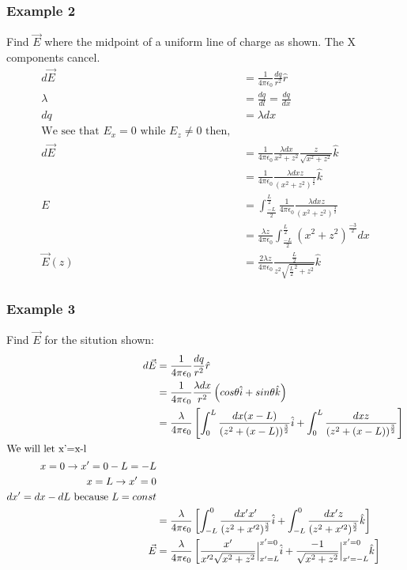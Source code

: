   \subsubsection{Example 2}
  Find $\vec{E}$ where the midpoint of a uniform line of charge as shown. The X components cancel.
  \begin{align*}
    d\vec{E}&=\frac{1}{4\pi\epsilon_0}\frac{dq}{r^2}\hat{r}\\
    \lambda&=\frac{dq}{dl}=\frac{dq}{dx}\\
    dq&=\lambda dx\\
    \text{We see that } E_x=0 \text{ while } E_z\neq 0 \text{ then, }\\
    d\vec{E}&=\frac{1}{4\pi\epsilon_0}\frac{\lambda dx}{x^2+z^2}\frac{z}{\sqrt{x^2+z^2}}\hat{k}\\
    &=\frac{1}{4\pi\epsilon_0}\frac{\lambda dxz}{(x^2+z^2)^{\frac{3}{2}}}\hat{k}\\
    E&=\int_{\frac{-L}{2}}^{\frac{L}{2}}\frac{1}{4\pi\epsilon_0}\frac{\lambda dxz}{(x^2+z^2)^{\frac{3}{2}}}\\
    &=\frac{\lambda z}{4\pi\epsilon_0}\int_{\frac{-L}{2}}^{\frac{L}{2}}(x^2+z^2)^{\frac{-3}{2}}dx\\
    \vec{E}(z)&=\frac{2\lambda z}{4\pi\epsilon_0}\frac{\frac{L}{2}}{z^2\sqrt{\frac{L}{2}^2+z^2}}\hat{k}
  \end{align*}
  \subsubsection{Example 3}
  Find $\vec{E}$ for the sitution shown:
  \begin{align*}
    d\vec{E}&=\frac{1}{4\pi\epsilon_0}\frac{dq}{r^2}\hat{r}\\
    &=\frac{1}{4\pi\epsilon_0}\frac{\lambda dx}{r^2}\left(cos\theta\hat{i}+sin\theta\hat{k}\right)\\
    &=\frac{\lambda}{4\pi\epsilon_0}\left[\int_{0}^{L}\frac{dx(x-L)}{(z^2+(x-L))^{\frac{3}{2}}}\hat{i}+\int_0^L\frac{dxz}{(z^2+(x-L))^{\frac{3}{2}}}  \right]\\
    \shortintertext{We will let x'=x-l } x=0\to x'=0-L=-L\\
    x=L\to x'=0\\
    dx'=dx-dL \text{ because } L=const\\
    &=\frac{\lambda}{4\pi\epsilon_0}\left[\int_{-L}^0\frac{dx'x'}{(z^2+x'^2)^{\frac{3}{2}}}\hat{i}+\int_{-L}^0\frac{dx'z}{(z^2+x'^2)^{\frac{3}{2}}}\hat{k}\right]\\
    \vec{E}&=\frac{\lambda}{4\pi\epsilon_0}\left[\frac{x'}{x'^2\sqrt{x^2+z^2}}\Big|_{x'=L}^{x'=0}\hat{i}+\frac{-1}{\sqrt{x^2+z^2}}\Big|_{x'=-L}^{x'=0}\hat{k}\right]
  \end{align*}
